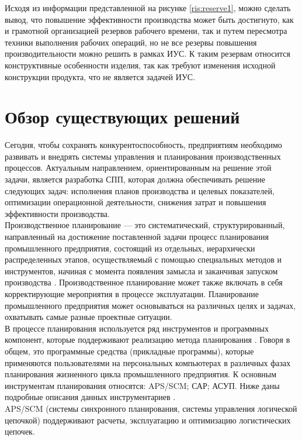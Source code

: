 Исходя из информации представленной на рисунке \ref{ris:reserve1}, можно сделать вывод, что повышение эффективности производства может быть достигнуто, как и грамотной организацией резервов рабочего времени, так и путем пересмотра техники выполнения рабочих операций, но не все резервы повышения производительности можно решить в рамках ИУС. К таким резервам относится конструктивные особенности изделия, так как требуют изменения исходной конструкции продукта, что не является задачей ИУС. 


\section{Обзор существующих решений}
\indent Сегодня, чтобы сохранять конкурентоспособность, предприятиям необходимо развивать и внедрять системы управления и планирования производственных процессов. 
Актуальным направлением, ориентированным на решение этой задачи, является разработка СПП, которая должна обеспечивать решение следующих задач: исполнения планов производства и целевых показателей, оптимизации операционной деятельности, снижения затрат и повышения эффективности производства.\\
\indent Производственное планирование — это систематический, структурированный, направленный на достижение поставленной задачи процесс планирования промышленного предприятия, состоящий из отдельных, иерархически распределенных этапов, осуществляемый с помощью специальных методов и инструментов, начиная с момента появления замысла и заканчивая запуском производства \cite{mulBook}.
Производственное планирование может также включать в себя корректирующие мероприятия в процессе эксплуатации. Планирование промышленного предприятия может основываться на различных целях и задачах, охватывать самые разные проектные ситуации.\\
\indent В процессе планирования используется ряд инструментов и программных компонент, которые поддерживают реализацию метода планирования \cite{lodonBook}.
Говоря в общем, это программные средства (прикладные программы), которые применяются пользователями на персональных компьютерах в различных фазах планирования жизненного цикла промышленного предприятия.
К основным инструментам планирования относятся: APS/SCM; САР; АСУП. 
Ниже даны подробные описания данных инструментариев \cite{oliriBook}.\\
\indent APS/SCM (системы синхронного планирования, системы управления логической цепочкой) поддерживают расчеты, эксплуатацию и оптимизацию логистических цепочек. 
